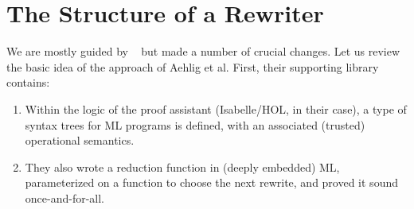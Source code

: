 \documentclass[a4paper,USenglish,cleveref,autoref,thm-restate]{lipics-v2021}
\newcommand{\citet}[1]{\usebibentry{#1}{citet}~\cite{#1}}
\newcommand{\defeq}{=}
\begin{document}


\section{The Structure of a Rewriter}\label{sec:structure}
We are mostly guided by \citet{Aehlig} but made a number of crucial changes.
Let us review the basic idea of the approach of Aehlig et al.
First, their supporting library contains:
\begin{enumerate}
\item
  Within the logic of the proof assistant (Isabelle/HOL, in their case), a type of syntax trees for ML programs is defined, with an associated (trusted) operational semantics.
\item
  They also wrote a reduction function in (deeply embedded) ML, parameterized on a function to choose the next rewrite, and proved it sound once-and-for-all.
\end{enumerate}
\end{document}
